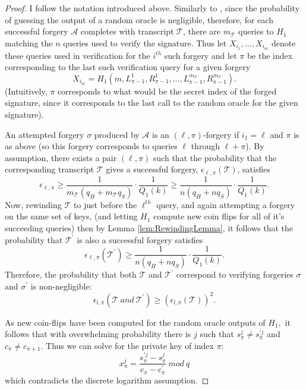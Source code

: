\documentclass[12pt,english]{mrl}
\theoremstyle{definition}
\numberwithin{equation}{section}
\numberwithin{figure}{section}
\numberwithin{equation}{section}
\numberwithin{equation}{section}
\numberwithin{figure}{section}
\begin{document}
\begin{proof}
I follow the notation introduced above. Similarly to \cite[Theorem 1]{LWW},
since the probability of guessing the output of a random oracle is
negligible, therefore, for each successful forgery $\mathcal{A}$ completes
with transcript $\mathcal{T}$, there are $m_{\mathcal{T}}$ queries
to $H_{1}$ matching the $n$ queries used to verify the signature.
Thus let $X_{i_{1}},...,X_{i_{m}}$ denote these queries used
in verification for the $i^{th}$ such forgery and let $\pi$ be the
index corresponding to the last such verification query for a given
forgery 
\[
X_{i_{m}}=H_{1}\left(m,L_{\pi-1}^{1},R_{\pi-1}^{1},...,L_{\pi-1}^{m_{\mathcal{T}}},R_{\pi-1}^{m_{\mathcal{T}}}\right).
\]
(Intuitively, $\pi$ corresponds to what would be the secret index
of the forged signature, since it corresponds to the last call to
the random oracle for the given signature).

An attempted forgery $\sigma$ produced by $\mathcal{A}$ is an $\left(\ell,\pi\right)$-forgery
if $i_{1}=\ell$ and $\pi$ is as above (so this forgery corresponds
to queries $\ell$ through $\ell+\pi$). By assumption, there exists
a pair $\left(\ell,\pi\right)$ such that the probability that the
corresponding transcript $\mathcal{T}$ gives a successful forgery, 
$\epsilon_{\ell,\pi}\left(\mathcal{T}\right)$, satisfies 
\[
\epsilon_{\ell,\pi}\ge\frac{1}{m_{\mathcal{T}}\left(q_{H}+m_{\mathcal{T}}q_{S}\right)}\cdot\frac{1}{Q_{1}\left(k\right)}\ge\frac{1}{n\left(q_{H}+nq_{S}\right)}\cdot\frac{1}{Q_{1}\left(k\right)}.
\]
 Now, rewinding $\mathcal{T}$ to just before the $\ell^{th}$ query,
and again attempting a forgery on the same set of keys, (and letting
$H_{1}$ compute new coin flips for all of it's succeeding queries)
then by Lemma \ref{lem:RewindingLemma}, it follows that the probability
that $\mathcal{\mathcal{T}^{\prime}}$ is also a successful forgery
satisfies 
\[
\epsilon_{\ell,\pi}\left(\mathcal{T}^{\prime}\right)\ge\frac{1}{n\left(q_{H}+nq_{S}\right)}\cdot\frac{1}{Q_{1}\left(k\right)}.
\]
 Therefore, the probability that both $\mathcal{T}$ and $\mathcal{T}^{\prime}$
correspond to verifying forgeries $\sigma$ and $\sigma^{\prime}$
is non-negligible: 
\[
\epsilon_{l,\pi}\left(\mathcal{T\ }and\ \mathcal{T}^{\prime}\right)\ge\left(\epsilon_{l,\pi}\left(\mathcal{T}\right)\right)^{2}.
\]


As new coin-flips have been computed for the random oracle outputs
of $H_{1},$ it follows that with overwhelming probability there is
$j$ such that $s_{\pi}^{j}\neq s_{\pi}^{\prime j}$ and $c_{\pi}\neq c_{\pi+1}$.
Thus we can solve for the private key of index $\pi$: 
\[
x_{\pi}^{j}=\frac{s_{\pi}^{\prime j}-s_{\pi}^{j}}{c_{\pi}-c_{\pi}^{\prime}}\ mod\ q
\]
 which contradicts the discrete logarithm assumption. 
\end{proof}
\end{document}
